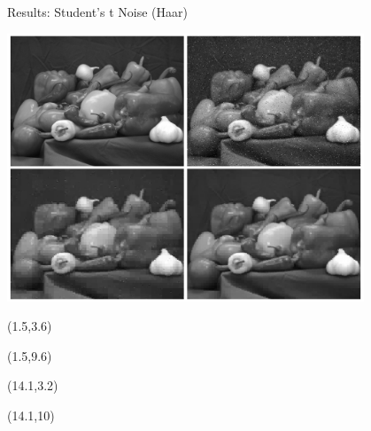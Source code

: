 \documentclass[12pt]{beamer}
\begin{document}
\begin{frame}{Results: Student's t Noise (Haar)}
\begin{center}
\vspace{-3 mm}
\includegraphics[width = 0.8\textwidth]{../figures/waveletStudentH.pdf} 
\end{center}

\begin{textblock}{5}(1.5,3.6)
\end{textblock}

\begin{textblock}{5}(1.5,9.6)
\end{textblock}

\begin{textblock}{5}(14.1,3.2)
\end{textblock}

\begin{textblock}{5}(14.1,10)
\end{textblock}
\end{frame}
\end{document}
